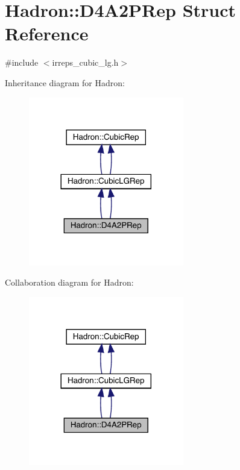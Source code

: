 \hypertarget{structHadron_1_1D4A2PRep}{}\section{Hadron\+:\+:D4\+A2\+P\+Rep Struct Reference}
\label{structHadron_1_1D4A2PRep}


{\ttfamily \#include $<$irreps\+\_\+cubic\+\_\+lg.\+h$>$}



Inheritance diagram for Hadron\+:\nopagebreak
\begin{figure}[H]
\begin{center}
\leavevmode
\includegraphics[width=192pt]{d4/d48/structHadron_1_1D4A2PRep__inherit__graph}
\end{center}
\end{figure}


Collaboration diagram for Hadron\+:\nopagebreak
\begin{figure}[H]
\begin{center}
\leavevmode
\includegraphics[width=192pt]{df/d72/structHadron_1_1D4A2PRep__coll__graph}
\end{center}
\end{figure}
